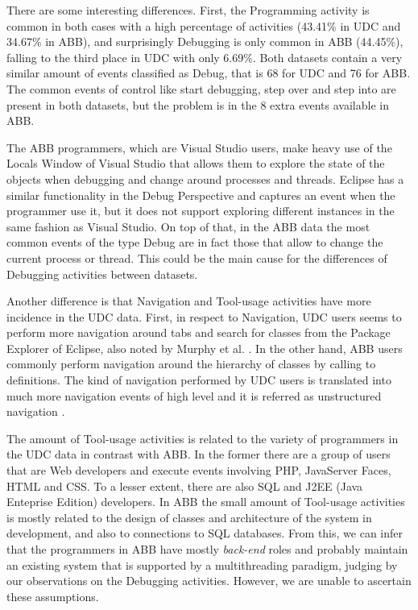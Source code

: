 There are some interesting differences. First, the Programming activity is common in both cases with a high percentage of activities (43.41\% in UDC and 34.67\% in ABB), and surprisingly Debugging is only common in ABB (44.45\%), falling to the third place in UDC with only 6.69\%. Both datasets contain a very similar amount of events classified as Debug, that is 68 for UDC and 76 for ABB. The common events of control like start debugging, step over and step into are present in both datasets, but the problem is in the 8 extra events available in ABB. 

The ABB programmers, which are Visual Studio users, make heavy use of the Locals Window of Visual Studio that allows them to explore the state of the objects when debugging and change around processes and threads. Eclipse has a similar functionality in the Debug Perspective and captures an event when the programmer use it, but it does not support exploring different instances in the same fashion as Visual Studio. On top of that, in the ABB data the most common events of the type Debug are in fact those that allow to change the current process or thread. This could be the main cause for the differences of Debugging activities between datasets.

Another difference is that Navigation and Tool-usage activities have more incidence in the UDC data. First, in respect to Navigation, UDC users seems to perform more navigation around tabs and search for classes from the Package Explorer of Eclipse, also noted by Murphy et al. \cite{MKF06}. In the other hand, ABB users commonly perform navigation around the hierarchy of classes by calling to definitions. The kind of navigation performed by UDC users is translated into much more navigation events of high level and it is referred as unstructured navigation \cite{AFQ15}.

The amount of Tool-usage activities is related to the variety of programmers in the UDC data in contrast with ABB. In the former there are a group of users that are Web developers and execute events involving PHP, JavaServer Faces, HTML and CSS. To a lesser extent, there are also SQL and J2EE (Java Enteprise Edition) developers. In ABB the small amount of Tool-usage activities is mostly related to the design of classes and architecture of the system in development, and also to connections to SQL databases. From this, we can infer that the programmers in ABB have mostly \emph{back-end} roles and probably maintain an existing system that is supported by a multithreading paradigm, judging by our observations on the Debugging activities. However, we are unable to ascertain these assumptions.

